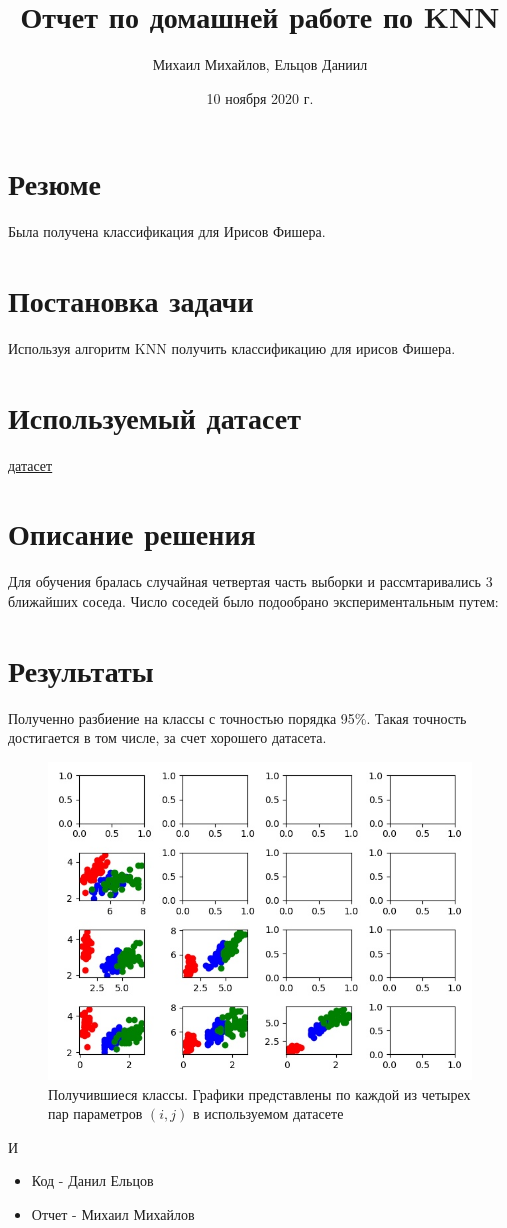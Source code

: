 \documentclass{article}
\title{Отчет по домашней работе по KNN}
\author{Михаил Михайлов, Ельцов Даниил}
\date{10 ноября 2020 г.}
\begin{document}
\maketitle
\tableofcontents

\section*{Резюме}
Была получена классификация для Ирисов Фишера. 
\newpage

\section{Постановка задачи}
Используя алгоритм KNN получить классификацию для ирисов Фишера.

\section{Используемый датасет}
\href{https://www.kaggle.com/uciёml/iris}{датасет}

\section{Описание решения}

Для обучения бралась случайная четвертая часть выборки и рассмтаривались 3 ближайших соседа. Число соседей было подообрано экспериментальным путем:


\section{Результаты}
Полученно разбиение на классы с точностью порядка 95\%. Такая точность достигается в том числе, за счет хорошего датасета. 

\begin{figure}[h!]
    \centering
    \includegraphics[scale=0.3]{results.jpg}
    \caption{Получившиеся классы. Графики представлены по каждой из четырех пар параметров \((i, j)\) в используемом датасете}
    \label{fig1}
\end{figure}

И

\begin{itemize}
    \item Код - Данил Ельцов
    \item Отчет - Михаил Михайлов
\end{itemize}
\end{document}
